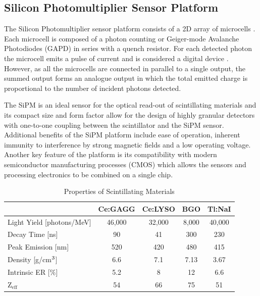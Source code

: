 \documentclass[journal]{IEEEtran}
\begin{document}
\subsection{Silicon Photomultiplier Sensor Platform}
The Silicon Photomultiplier sensor platform consists of a 2D array of microcells \cite{sipm:saveliev, sipm:stewart}. Each microcell is composed of a photon counting or Geiger-mode Avalanche Photodiodes (GAPD) in series with a quench resistor. For each detected photon the microcell emits a pulse of current and is considered a digital device \cite{stew02:stewart}. However, as all the microcells are connected in parallel to a single output, the summed output forms an analogue output in which the total emitted charge is proportional to the number of incident photons detected. 

The SiPM is an ideal sensor for the optical read-out of scintillating materials and its compact size and form factor allow for the design of highly granular detectors with one-to-one coupling between the scintillator and the SiPM sensor. Additional benefits of the SiPM platform include ease of operation, inherent immunity to interference by strong magnetic fields and a low operating voltage. Another key feature of the platform is its compatibility with modern semiconductor manufacturing processes (CMOS) which allows the sensors and processing electronics to be combined on a single chip. 

\begin{table}[bt]
\renewcommand{\arraystretch}{1.3}
\caption{Properties of Scintillating Materials}
\label{tab:scint_properties}
\centering
\begin{tabular}{l | c | c | c | c }
\hline
\bfseries  & \bfseries Ce:GAGG & \bfseries Ce:LYSO & \bfseries BGO & \bfseries Tl:NaI \\
\hline \hline
Light Yield [photons/MeV] & 46,000 & 32,000 & 8,000 & 40,000\\
Decay Time [ns] & 90 & 41 & 300 & 230\\
Peak Emission [nm] & 520 & 420 & 480 & 415\\
Density [g/cm$\textsuperscript{3}$] & 6.6 & 7.1 & 7.13 & 3.67\\
Intrinsic ER [\%] & 5.2 & 8 & 12 & 6.6\\
Z$_{\text{eff}}$  & 54 & 66 & 75 & 51\\
\hline
\end{tabular}
\end{table}
\end{document}
